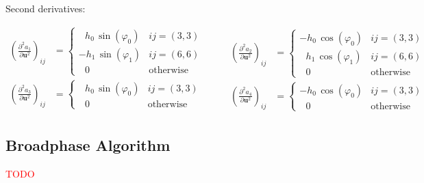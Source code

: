 Second derivatives:

\begin{equation*}
\begin{aligned}
\left(\frac{\partial^2 a_1}{\partial \boldsymbol{u}^2}\right)_{ij} &=
\begin{cases}
\:\:\:h_0\,\sin(\varphi_0) & \text{$ij = (3,3)$}\\
-h_1\,\sin(\varphi_1) & \text{$ij = (6,6)$}\\
\:\:\:0 & \text{otherwise}
\end{cases}\\
\left(\frac{\partial^2 a_3}{\partial \boldsymbol{u}^2}\right)_{ij} &=
\begin{cases}
\:\:\:h_0\,\sin(\varphi_0) & \text{$ij = (3,3)$}\\
\:\:\:0 & \text{otherwise}
\end{cases}\\
\end{aligned}
\qquad
\begin{aligned}
\left(\frac{\partial^2 a_2}{\partial \boldsymbol{u}^2}\right)_{ij} &=
\begin{cases}
-h_0\,\cos(\varphi_0) & \text{$ij = (3,3)$}\\
\:\:\:h_1\,\cos(\varphi_1) & \text{$ij = (6,6)$}\\
\:\:\:0 & \text{otherwise}
\end{cases}\\
\left(\frac{\partial^2 a_4}{\partial \boldsymbol{u}^2}\right)_{ij} &=
\begin{cases}
-h_0\,\cos(\varphi_0) & \text{$ij = (3,3)$}\\
\:\:\:0 & \text{otherwise}
\end{cases}
\end{aligned}
\end{equation*}

\subsection{Broadphase Algorithm}

\textcolor{red}{TODO}